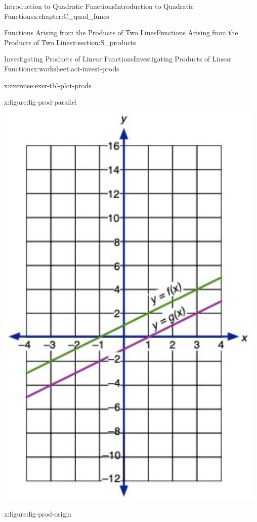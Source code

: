 \documentclass[oneside,10pt,]{book}
\numberwithin{equation}{chapter}
\begin{document}
\begin{chapterptx}{Introduction to Quadratic Functions}{}{Introduction to Quadratic Functions}{}{}{x:chapter:C_quad_funcs}
\begin{sectionptx}{Functions Arising from the Products of Two Lines}{}{Functions Arising from the Products of Two Lines}{}{}{x:section:S_products}
\begin{worksheet-subsection}{Investigating Products of Linear Functions}{}{Investigating Products of Linear Functions}{}{}{x:worksheet:act-invest-prods}
\begin{divisionexercise}{1}{}{}{x:exercise:exer-tbl-plot-prods}
\begin{sidebyside}{3}{0}{0}{0}
\begin{sbspanel}{0.333333333333333}
\begin{figureptx}{}{x:figure:fig-prod-parallel}{}
\includegraphics[width=\linewidth]{external/prod-parallel.pdf}
\tcblower
\end{figureptx}%
\end{sbspanel}%
\begin{sbspanel}{0.333333333333333}%
\begin{figureptx}{}{x:figure:fig-prod-origin}{}%

\end{figureptx}
\end{sbspanel}
\end{sidebyside}
\end{divisionexercise}
\end{worksheet-subsection}
\end{sectionptx}
\end{chapterptx}
\end{document}
